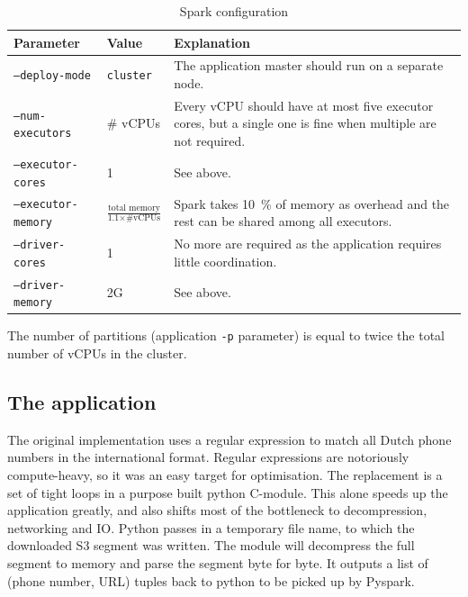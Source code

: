\documentclass{article}
\begin{document}
\begin{table}[H]
	\caption{Spark configuration}
	\label{tab:spark-config}
	\centering

	\begin{tabular}{llp{6cm}}
	\toprule
	Parameter					& Value	& Explanation \\
	\midrule
	\texttt{--deploy-mode} 		& \texttt{cluster}				& The application master should run on a separate node. \\
	\texttt{--num-executors}	& \# vCPUs		  				& Every vCPU should have at most five executor cores, but a single one is fine when multiple are not required. \\
	\texttt{--executor-cores}	& 1								& See above. \\
	\texttt{--executor-memory}	& $\frac{\text{total memory}}{\text{1.1} \times \text{\# vCPUs}}$	& Spark takes \SI{10}{\percent} of memory as overhead and the rest can be shared among all executors. \\
	\texttt{--driver-cores}		& 1								& No more are required as the application requires little coordination. \\
	\texttt{--driver-memory}	& 2G							& See above. \\
	\bottomrule
	\end{tabular}
\end{table}

The number of partitions (application \texttt{-p} parameter) is equal to twice the total number of vCPUs in the cluster.

\subsection{The application}
The original implementation uses a regular expression to match all Dutch phone numbers in the international format.
Regular expressions are notoriously compute-heavy, so it was an easy target for optimisation.
The replacement is a set of tight loops in a purpose built python C-module.
This alone speeds up the application greatly, and also shifts most of the bottleneck to decompression, networking and IO.
Python passes in a temporary file name, to which the downloaded S3 segment was written.
The module will decompress the full segment to memory and parse the segment byte for byte.
It outputs a list of (phone number, URL) tuples back to python to be picked up by Pyspark.
\end{document}
